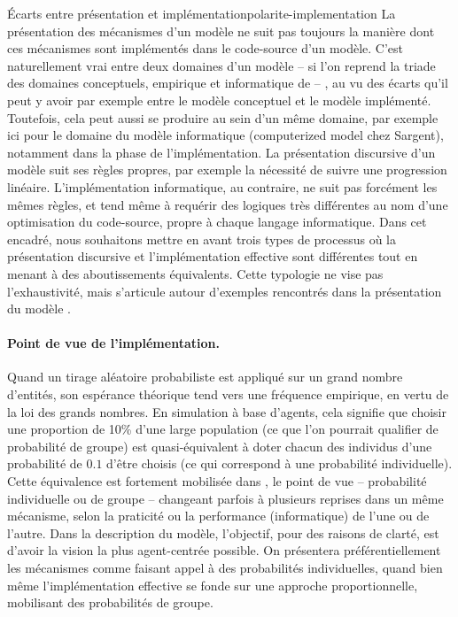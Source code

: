\bigskip 
\begin{encadre}{Écarts entre présentation et implémentation}{polarite-implementation}
		\renewcommand{\thempfootnote}{\alph{mpfootnote}}
La présentation des mécanismes d'un modèle ne suit pas toujours la manière dont ces mécanismes sont implémentés dans le code-source d'un modèle.
C'est naturellement vrai entre deux \og domaines\fg{} d'un modèle -- si l'on reprend la triade des domaines conceptuels, empirique et informatique de \textcite[\ppno~3, fig. 2]{sargent2009verification} --
, au vu des écarts qu'il peut y avoir par exemple entre le modèle conceptuel et le modèle implémenté.
Toutefois, cela peut aussi se produire au sein d'un même domaine, par exemple ici pour le domaine du modèle informatique (\og computerized model\fg{} chez Sargent), notamment dans la phase de l'implémentation.
La présentation discursive d'un modèle suit ses règles propres, par exemple la nécessité de suivre une progression linéaire.
L'implémentation informatique, au contraire, ne suit pas forcément les mêmes règles, et tend même à requérir des logiques très différentes au nom d'une \og optimisation\fg{} du code-source, propre à chaque langage informatique.
Dans cet encadré, nous souhaitons mettre en avant trois types de processus où la présentation discursive et l'implémentation effective sont différentes tout en menant à des aboutissements équivalents.
Cette typologie ne vise pas l'exhaustivité, mais s'articule autour d'exemples rencontrés dans la présentation du modèle \simfeodal{}.

\paragraph{Point de vue de l'implémentation.} Quand un tirage aléatoire probabiliste est appliqué sur un grand nombre d'entités, son espérance théorique tend vers une fréquence empirique, en vertu de la loi des grands nombres.
En simulation à base d'agents, cela signifie que choisir une proportion de 10\% d'une large population (ce que l'on pourrait qualifier de \og probabilité de groupe\fg{}) est quasi-équivalent à doter chacun des individus d'une probabilité de $0.1$ d'être choisis (ce qui correspond à une \og probabilité individuelle\fg{}).
Cette équivalence est fortement mobilisée dans \simfeodal{}, le \og point de vue\fg{} -- probabilité individuelle ou de groupe -- changeant parfois à plusieurs reprises dans un même mécanisme, selon la praticité ou la performance (informatique) de l'une ou de l'autre.
Dans la description du modèle, l'objectif, pour des raisons de clarté, est d'avoir la vision la plus \og agent-centrée\fg{} possible.
On présentera préférentiellement les mécanismes comme faisant appel à des probabilités individuelles, quand bien même l'implémentation effective se fonde sur une approche proportionnelle, mobilisant des probabilités de groupe.


\end{encadre}
